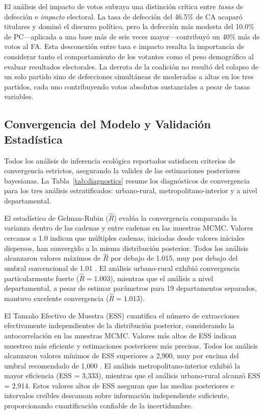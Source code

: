 El análisis del impacto de votos subraya una distinción crítica entre \textit{tasas} de defección e \textit{impacto} electoral. La tasa de defección del 46.5\% de CA acaparó titulares y dominó el discurso político, pero la defección más modesta del 10.0\% de PC---aplicada a una base más de seis veces mayor---contribuyó un 40\% más de votos al FA. Esta desconexión entre tasa e impacto resalta la importancia de considerar tanto el comportamiento de los votantes como el peso demográfico al evaluar resultados electorales. La derrota de la coalición no resultó del colapso de un solo partido sino de defecciones simultáneas de moderadas a altas en los tres partidos, cada uno contribuyendo votos absolutos sustanciales a pesar de tasas variables.

\subsection{Convergencia del Modelo y Validación Estadística}
\label{sec:resultados_diagnosticos}

Todos los análisis de inferencia ecológica reportados satisfacen criterios de convergencia estrictos, asegurando la validez de las estimaciones posteriores bayesianas. La Tabla~\ref{tab:diagnostics} resume los diagnósticos de convergencia para los tres análisis estratificados: urbano-rural, metropolitano-interior y a nivel departamental.



El estadístico de Gelman-Rubin ($\hat{R}$) evalúa la convergencia comparando la varianza dentro de las cadenas y entre cadenas en las muestras MCMC. Valores cercanos a 1.0 indican que múltiples cadenas, iniciadas desde valores iniciales dispersos, han convergido a la misma distribución posterior. Todos los análisis alcanzaron valores máximos de $\hat{R}$ por debajo de 1.015, muy por debajo del umbral convencional de 1.01 \citep{gelman2013bayesian}. El análisis urbano-rural exhibió convergencia particularmente fuerte ($\hat{R} = 1.003$), mientras que el análisis a nivel departamental, a pesar de estimar parámetros para 19 departamentos separados, mantuvo excelente convergencia ($\hat{R} = 1.013$).

El Tamaño Efectivo de Muestra (ESS) cuantifica el número de extracciones efectivamente independientes de la distribución posterior, considerando la autocorrelación en las muestras MCMC. Valores más altos de ESS indican muestreo más eficiente y estimaciones posteriores más precisas. Todos los análisis alcanzaron valores mínimos de ESS superiores a 2,900, muy por encima del umbral recomendado de 1,000 \citep{gelman2013bayesian}. El análisis metropolitano-interior exhibió la mayor eficiencia (ESS = 3,333), mientras que el análisis urbano-rural alcanzó ESS = 2,914. Estos valores altos de ESS aseguran que las medias posteriores e intervalos creíbles descansan sobre información independiente suficiente, proporcionando cuantificación confiable de la incertidumbre.

